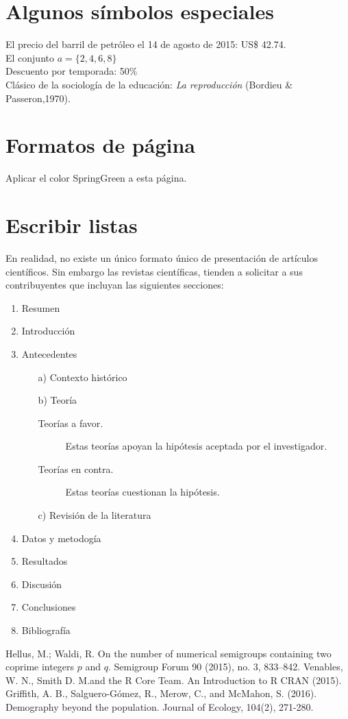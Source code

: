 \documentclass[12pt,a4paper]{article}
\begin{document}
\section{Algunos símbolos especiales}

\noindent El precio del barril de petróleo el 14 de agosto de 2015: US\$ 42.74.\\
El conjunto $a=\{2,4,6,8\}$\\
Descuento por temporada: 50\%\\
Clásico de la sociología de la educación: \textit{La  reproducción} (Bordieu \& Passeron,1970).
\pagebreak

\section{Formatos de página}

\pagecolor{LimeGreen}
Aplicar el color SpringGreen a esta página.

\section{Escribir listas}

En realidad, no existe un único formato único de presentación de artículos científicos. Sin embargo las revistas científicas, tienden a solicitar a sus contribuyentes que incluyan las siguientes secciones:
\begin{enumerate}
\item Resumen
\item Introducción
\item Antecedentes
\begin{itemize}
\item[a)] Contexto histórico
\item[b)] Teoría
\begin{description}
\item[Teorías a favor.] Estas teorías apoyan la hipótesis aceptada por el investigador.
\item[Teorías en contra.] Estas teorías cuestionan la hipótesis.
\end{description}
\item[c)] Revisión de la literatura
\end{itemize}
\item Datos y metodogía
\item Resultados
\item Discusión
\item Conclusiones
\item Bibliografía
\end{enumerate}
\begin{thebibliography}{9}  Hellus, M.; Waldi, R. On the number of numerical semigroups containing two coprime integers $p$ and $q$. Semigroup Forum 90 (2015), no. 3, 833--842.
 Venables, W. N., Smith D. M.and the R Core Team. An Introduction to R CRAN (2015).
 Griffith, A. B., Salguero-Gómez, R., Merow, C., and McMahon, S. (2016). Demography beyond the population. Journal of Ecology, 104(2), 271-280.
\end{thebibliography}
\end{document}
